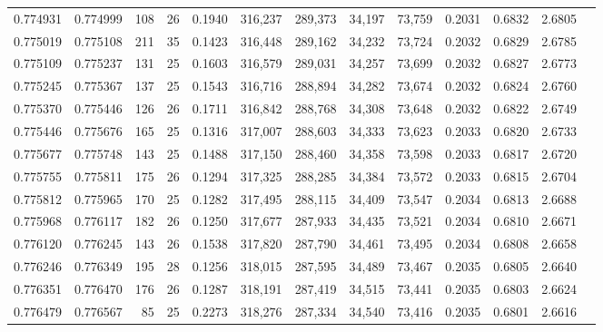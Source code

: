 \begin{tabular}{rrrrrrrrrrrrr}
0.774931 & 0.774999 &   108 &  26 &                                     0.1940 & 316,237 & 289,373 &  34,197 &  73,759 & 0.2031 & 0.6832 & 2.6805 \\
0.775019 & 0.775108 &   211 &  35 &                                     0.1423 & 316,448 & 289,162 &  34,232 &  73,724 & 0.2032 & 0.6829 & 2.6785 \\
0.775109 & 0.775237 &   131 &  25 &                                     0.1603 & 316,579 & 289,031 &  34,257 &  73,699 & 0.2032 & 0.6827 & 2.6773 \\
0.775245 & 0.775367 &   137 &  25 &                                     0.1543 & 316,716 & 288,894 &  34,282 &  73,674 & 0.2032 & 0.6824 & 2.6760 \\
0.775370 & 0.775446 &   126 &  26 &                                     0.1711 & 316,842 & 288,768 &  34,308 &  73,648 & 0.2032 & 0.6822 & 2.6749 \\
0.775446 & 0.775676 &   165 &  25 &                                     0.1316 & 317,007 & 288,603 &  34,333 &  73,623 & 0.2033 & 0.6820 & 2.6733 \\
0.775677 & 0.775748 &   143 &  25 &                                     0.1488 & 317,150 & 288,460 &  34,358 &  73,598 & 0.2033 & 0.6817 & 2.6720 \\
0.775755 & 0.775811 &   175 &  26 &                                     0.1294 & 317,325 & 288,285 &  34,384 &  73,572 & 0.2033 & 0.6815 & 2.6704 \\
0.775812 & 0.775965 &   170 &  25 &                                     0.1282 & 317,495 & 288,115 &  34,409 &  73,547 & 0.2034 & 0.6813 & 2.6688 \\
0.775968 & 0.776117 &   182 &  26 &                                     0.1250 & 317,677 & 287,933 &  34,435 &  73,521 & 0.2034 & 0.6810 & 2.6671 \\
0.776120 & 0.776245 &   143 &  26 &                                     0.1538 & 317,820 & 287,790 &  34,461 &  73,495 & 0.2034 & 0.6808 & 2.6658 \\
0.776246 & 0.776349 &   195 &  28 &                                     0.1256 & 318,015 & 287,595 &  34,489 &  73,467 & 0.2035 & 0.6805 & 2.6640 \\
0.776351 & 0.776470 &   176 &  26 &                                     0.1287 & 318,191 & 287,419 &  34,515 &  73,441 & 0.2035 & 0.6803 & 2.6624 \\
0.776479 & 0.776567 &    85 &  25 &                                     0.2273 & 318,276 & 287,334 &  34,540 &  73,416 & 0.2035 & 0.6801 & 2.6616 \\

\end{tabular}
